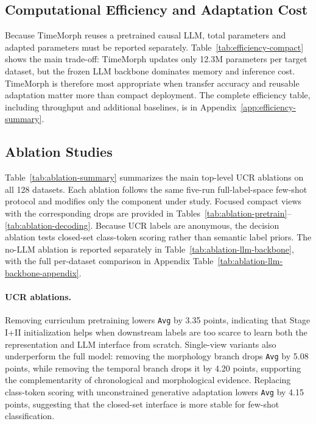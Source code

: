 \documentclass{article}
\begin{document}


\subsection{Computational Efficiency and Adaptation Cost}
\label{sec:efficiency}

Because TimeMorph reuses a pretrained causal LLM, total parameters and adapted parameters must be reported separately. Table~\ref{tab:efficiency-compact} shows the main trade-off: TimeMorph updates only 12.3M parameters per target dataset, but the frozen LLM backbone dominates memory and inference cost. TimeMorph is therefore most appropriate when transfer accuracy and reusable adaptation matter more than compact deployment. The complete efficiency table, including throughput and additional baselines, is in Appendix~\ref{app:efficiency-summary}.



\subsection{Ablation Studies}

Table~\ref{tab:ablation-summary} summarizes the main top-level UCR ablations on all 128 datasets. Each ablation follows the same five-run full-label-space few-shot protocol and modifies only the component under study. Focused compact views with the corresponding drops are provided in Tables~\ref{tab:ablation-pretrain}--\ref{tab:ablation-decoding}. Because UCR labels are anonymous, the decision ablation tests closed-set class-token scoring rather than semantic label priors. The no-LLM ablation is reported separately in Table~\ref{tab:ablation-llm-backbone}, with the full per-dataset comparison in Appendix Table~\ref{tab:ablation-llm-backbone-appendix}.



\paragraph{UCR ablations.}
Removing curriculum pretraining lowers \texttt{Avg} by 3.35 points, indicating
that Stage I+II initialization helps when downstream labels are too scarce to
learn both the representation and LLM interface from scratch. Single-view
variants also underperform the full model: removing the morphology branch drops
\texttt{Avg} by 5.08 points, while removing the temporal branch drops it by 4.20
points, supporting the complementarity of chronological and morphological
evidence. Replacing class-token scoring with unconstrained generative adaptation
lowers \texttt{Avg} by 4.15 points, suggesting that the closed-set interface is
more stable for few-shot classification.
\end{document}
